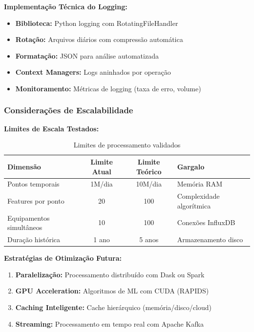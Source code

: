 \textbf{Implementação Técnica do Logging:}

\begin{itemize}
    \item \textbf{Biblioteca:} Python logging com RotatingFileHandler
    \item \textbf{Rotação:} Arquivos diários com compressão automática
    \item \textbf{Formatação:} JSON para análise automatizada
    \item \textbf{Context Managers:} Logs aninhados por operação
    \item \textbf{Monitoramento:} Métricas de logging (taxa de erro, volume)
\end{itemize}

\subsubsection{Considerações de Escalabilidade}

\textbf{Limites de Escala Testados:}

\begin{table}[H]
\centering
\caption{Limites de processamento validados}
\begin{tabular}{|l|c|c|l|}
\hline
\textbf{Dimensão} & \textbf{Limite Atual} & \textbf{Limite Teórico} & \textbf{Gargalo} \\
\hline
Pontos temporais & 1M/dia & 10M/dia & Memória RAM \\
Features por ponto & 20 & 100 & Complexidade algorítmica \\
Equipamentos simultâneos & 10 & 100 & Conexões InfluxDB \\
Duração histórica & 1 ano & 5 anos & Armazenamento disco \\
\hline
\end{tabular}
\end{table}

\textbf{Estratégias de Otimização Futura:}

\begin{enumerate}
    \item \textbf{Paralelização:} Processamento distribuído com Dask ou Spark
    \item \textbf{GPU Acceleration:} Algoritmos de ML com CUDA (RAPIDS)
    \item \textbf{Caching Inteligente:} Cache hierárquico (memória/disco/cloud)
    \item \textbf{Streaming:} Processamento em tempo real com Apache Kafka
\end{enumerate}

